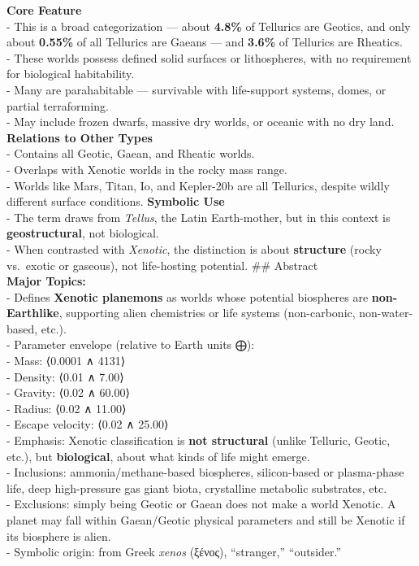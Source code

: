 \documentclass[
  letterpaper,
]{book}
\begin{document}
\textbf{Core Feature}\\
- This is a broad categorization --- about \textbf{4.8\%} of Tellurics
are Geotics, and only about \textbf{0.55\%} of all Tellurics are Gaeans
--- and \textbf{3.6\%} of Tellurics are Rheatics.\\
- These worlds possess defined solid surfaces or lithospheres, with no
requirement for biological habitability.\\
- Many are parahabitable --- survivable with life-support systems,
domes, or partial terraforming.\\
- May include frozen dwarfs, massive dry worlds, or oceanic with no dry
land. \textbf{Relations to Other Types}\\
- Contains all Geotic, Gaean, and Rheatic worlds.\\
- Overlaps with Xenotic worlds in the rocky mass range.\\
- Worlds like Mars, Titan, Io, and Kepler-20b are all Tellurics, despite
wildly different surface conditions. \textbf{Symbolic Use}\\
- The term draws from \emph{Tellus}, the Latin Earth-mother, but in this
context is \textbf{geostructural}, not biological.\\
- When contrasted with \emph{Xenotic}, the distinction is about
\textbf{structure} (rocky vs.~exotic or gaseous), not life-hosting
potential. \#\# Abstract\\
\textbf{Major Topics:}\\
- Defines \textbf{Xenotic planemons} as worlds whose potential
biospheres are \textbf{non-Earthlike}, supporting alien chemistries or
life systems (non-carbonic, non-water-based, etc.).\\
- Parameter envelope (relative to Earth units ⨁):\\
- Mass: ⟨0.0001 ∧ 4131⟩\\
- Density: ⟨0.01 ∧ 7.00⟩\\
- Gravity: ⟨0.02 ∧ 60.00⟩\\
- Radius: ⟨0.02 ∧ 11.00⟩\\
- Escape velocity: ⟨0.02 ∧ 25.00⟩\\
- Emphasis: Xenotic classification is \textbf{not structural} (unlike
Telluric, Geotic, etc.), but \textbf{biological}, about what kinds of
life might emerge.\\
- Inclusions: ammonia/methane-based biospheres, silicon-based or
plasma-phase life, deep high-pressure gas giant biota, crystalline
metabolic substrates, etc.\\
- Exclusions: simply being Geotic or Gaean does not make a world
Xenotic. A planet may fall within Gaean/Geotic physical parameters and
still be Xenotic if its biosphere is alien.\\
- Symbolic origin: from Greek \emph{xenos} (ξένος), ``stranger,''
``outsider.''
\end{document}
